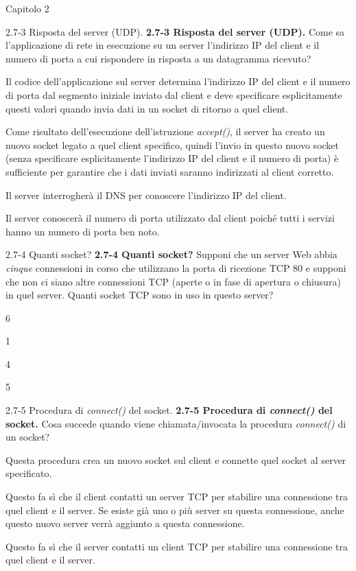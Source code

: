 \documentclass[11pt]{article}
\begin{document}
\begin{quiz}{Capitolo 2}
\begin{multi}[points=1,shuffle]{2.7-3 Risposta del server (UDP).}
\textbf{2.7-3 Risposta del server (UDP).}
Come sa l'applicazione di rete in esecuzione su un server l'indirizzo IP del client e il numero di porta a cui rispondere in risposta a un datagramma ricevuto?
\item* Il codice dell'applicazione sul server determina l'indirizzo IP del client e il numero di porta dal segmento iniziale inviato dal client e deve specificare esplicitamente questi valori quando invia dati in un socket di ritorno a quel client.
\item Come risultato dell'esecuzione dell'istruzione \emph{accept()}, il server ha creato un nuovo socket legato a quel client specifico, quindi l'invio in questo nuovo socket (senza specificare esplicitamente l'indirizzo IP del client e il numero di porta) è sufficiente per garantire che i dati inviati saranno indirizzati al client corretto.
\item Il server interrogherà il DNS per conoscere l'indirizzo IP del client.
\item Il server conoscerà il numero di porta utilizzato dal client poiché tutti i servizi hanno un numero di porta ben noto.
\end{multi}

\begin{multi}[points=1,shuffle]{2.7-4 Quanti socket?}
\textbf{2.7-4 Quanti socket?}
Supponi che un server Web abbia \emph{cinque} connessioni in corso che utilizzano la porta di ricezione TCP 80 e supponi che non ci siano altre connessioni TCP (aperte o in fase di apertura o chiusura) in quel server. Quanti socket TCP sono in uso in questo server?
\item* 6
\item 1
\item 4
\item 5
\end{multi}

\begin{multi}[points=1,shuffle]{2.7-5 Procedura di \emph{connect()} del socket.}
\textbf{2.7-5 Procedura di \emph{connect()} del socket.}
Cosa succede quando viene chiamata/invocata la procedura \emph{connect()} di un socket?
\item* Questa procedura crea un nuovo socket sul client e connette quel socket al server specificato.
\item Questo fa sì che il client contatti un server TCP per stabilire una connessione tra quel client e il server. Se esiste già uno o più server su questa connessione, anche questo nuovo server verrà aggiunto a questa connessione.
\item Questo fa sì che il server contatti un client TCP per stabilire una connessione tra quel client e il server.
\end{multi}
                              
\end{quiz}
\end{document}
